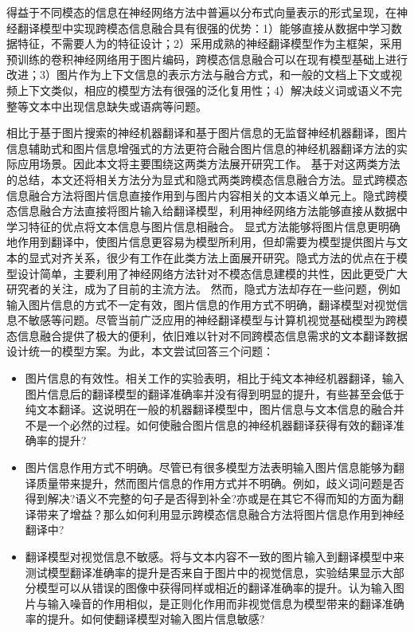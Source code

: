 得益于不同模态的信息在神经网络方法中普遍以分布式向量表示的形式呈现，在神经翻译模型中实现跨模态信息融合具有很强的优势：1）能够直接从数据中学习数据特征，不需要人为的特征设计；2）采用成熟的神经翻译模型作为主框架，采用预训练的卷积神经网络用于图片编码，跨模态信息融合可以在现有模型基础上进行改进；3）图片作为上下文信息的表示方法与融合方式，和一般的文档上下文或视频上下文类似，相应的模型方法有很强的泛化复用性；4）解决歧义词或语义不完整等文本中出现信息缺失或语病等问题。

相比于基于图片搜索的神经机器翻译和基于图片信息的无监督神经机器翻译，图片信息辅助式和图片信息增强式的方法更符合融合图片信息的神经机器翻译方法的实际应用场景。因此本文将主要围绕这两类方法展开研究工作。
基于对这两类方法的总结，本文还将相关方法分为显式和隐式两类跨模态信息融合方法。显式跨模态信息融合方法将图片信息直接作用到与图片内容相关的文本语义单元上。隐式跨模态信息融合方法直接将图片输入给翻译模型，利用神经网络方法能够直接从数据中学习特征的优点将文本信息与图片信息相融合。
显式方法能够将图片信息更明确地作用到翻译中，使图片信息更容易为模型所利用，但却需要为模型提供图片与文本的显式对齐关系，很少有工作在此类方法上面展开研究。隐式方法的优点在于模型设计简单，主要利用了神经网络方法针对不模态信息建模的共性，因此更受广大研究者的关注，成为了目前的主流方法。
然而，隐式方法却存在一些问题，例如输入图片信息的方式不一定有效，图片信息的作用方式不明确，翻译模型对视觉信息不敏感等问题。尽管当前广泛应用的神经翻译模型与计算机视觉基础模型为跨模态信息融合提供了极大的便利，依旧难以针对不同跨模态信息需求的文本翻译数据设计统一的模型方案。为此，本文尝试回答三个问题：
\begin{itemize}
    \item {\sffamily 图片信息的有效性}。相关工作的实验表明，相比于纯文本神经机器翻译，输入图片信息后的翻译模型的翻译准确率并没有得到明显的提升，有些甚至会低于纯文本翻译。这说明在一般的机器翻译模型中，图片信息与文本信息的融合并不是一个必然的过程。如何使融合图片信息的神经机器翻译获得有效的翻译准确率的提升?
    \item {\sffamily 图片信息作用方式不明确}。尽管已有很多模型方法表明输入图片信息能够为翻译质量带来提升，然而图片信息的作用方式并不明确。例如，歧义词问题是否得到解决?语义不完整的句子是否得到补全?亦或是在其它不得而知的方面为翻译带来了增益？那么如何利用显示跨模态信息融合方法将图片信息作用到神经翻译中?
    \item {\sffamily 翻译模型对视觉信息不敏感}。将与文本内容不一致的图片输入到翻译模型中来测试模型翻译准确率的提升是否来自于图片中的视觉信息，实验结果显示大部分模型可以从错误的图像中获得同样或相近的翻译准确率的提升。认为输入图片与输入噪音的作用相似，是正则化作用而非视觉信息为模型带来的翻译准确率的提升。如何使翻译模型对输入图片信息敏感?
\end{itemize}

